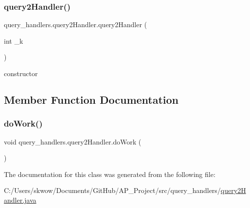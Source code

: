 \subsubsection{\texorpdfstring{query2\+Handler()}{query2Handler()}}
{\footnotesize\ttfamily query\+\_\+handlers.\+query2\+Handler.\+query2\+Handler (\begin{DoxyParamCaption}\item[{int}]{\+\_\+k }\end{DoxyParamCaption})}



constructor 



\subsection{Member Function Documentation}
\hypertarget{classquery__handlers_1_1query2_handler_aea6272ec7e1d5c8806f95120c64f2d8c}{}\label{classquery__handlers_1_1query2_handler_aea6272ec7e1d5c8806f95120c64f2d8c} 
\subsubsection{\texorpdfstring{do\+Work()}{doWork()}}
{\footnotesize\ttfamily void query\+\_\+handlers.\+query2\+Handler.\+do\+Work (\begin{DoxyParamCaption}{ }\end{DoxyParamCaption})}



The documentation for this class was generated from the following file\+:\begin{DoxyCompactItemize}
\item 
C\+:/\+Users/skwow/\+Documents/\+Git\+Hub/\+A\+P\+\_\+\+Project/src/query\+\_\+handlers/\hyperlink{query2_handler_8java}{query2\+Handler.\+java}\end{DoxyCompactItemize}
